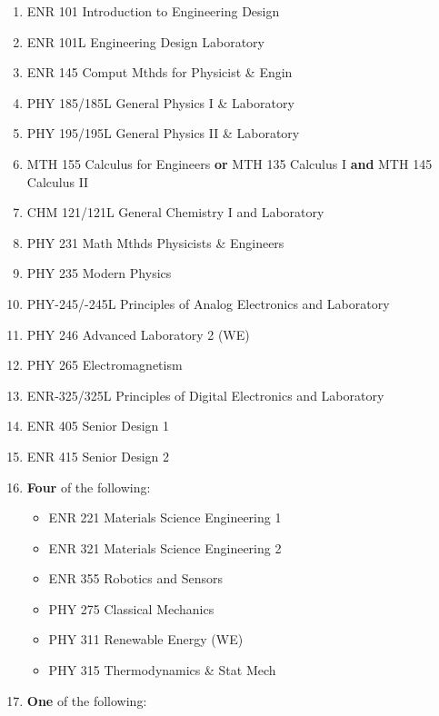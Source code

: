\documentclass[
  letterpaper,
]{scrbook}
\providecommand{\tightlist}{%
  \setlength{\itemsep}{0pt}\setlength{\parskip}{0pt}}
\begin{document}
\begin{enumerate}
\def\labelenumi{\arabic{enumi}.}
\tightlist
\item
  ENR 101 Introduction to Engineering Design\\
\item
  ENR 101L Engineering Design Laboratory\\
\item
  ENR 145 Comput Mthds for Physicist \& Engin\\
\item
  PHY 185/185L General Physics I \& Laboratory\\
\item
  PHY 195/195L General Physics II \& Laboratory\\
\item
  MTH 155 Calculus for Engineers \textbf{or} MTH 135 Calculus I
  \textbf{and} MTH 145 Calculus II\\
\item
  CHM 121/121L General Chemistry I and Laboratory\\
\item
  PHY 231 Math Mthds Physicists \& Engineers\\
\item
  PHY 235 Modern Physics\\
\item
  PHY-245/-245L Principles of Analog Electronics and Laboratory\\
\item
  PHY 246 Advanced Laboratory 2 (WE)\\
\item
  PHY 265 Electromagnetism\\
\item
  ENR-325/325L Principles of Digital Electronics and Laboratory\\
\item
  ENR 405 Senior Design 1\\
\item
  ENR 415 Senior Design 2\\
\item
  \textbf{Four} of the following:

  \begin{itemize}
  \tightlist
  \item
    ENR 221 Materials Science Engineering 1\\
  \item
    ENR 321 Materials Science Engineering 2\\
  \item
    ENR 355 Robotics and Sensors\\
  \item
    PHY 275 Classical Mechanics\\
  \item
    PHY 311 Renewable Energy (WE)\\
  \item
    PHY 315 Thermodynamics \& Stat Mech\\
  \end{itemize}
\item
  \textbf{One} of the following:


\end{enumerate}
\end{document}
